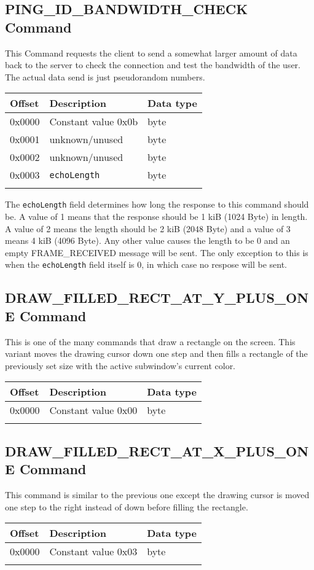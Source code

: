 \documentclass{article}
\newcommand{\field}[1]{\textcolor{fieldColor}{\texttt{#1}}}
\newenvironment{bytelisting}
{\ttfamily \begin{center} \begin{tabular}{l l l} Offset & Description & Data type \\ \hline}
{\normalfont \end{tabular} \end{center}}
\begin{document}
\subsection{PING\_ID\_BANDWIDTH\_CHECK Command}
This Command requests the client to send a somewhat larger amount of data back to the server to check the connection and test the bandwidth of the user. The actual data send is just 
pseudorandom numbers.

\begin{bytelisting}
0x0000 & Constant value 0x0b & byte \\
0x0001 & unknown/unused & byte \\
0x0002 & unknown/unused & byte \\
0x0003 & \field{echoLength} & byte \\
\end{bytelisting}

The \field{echoLength} field determines how long the response to this command should be. A value of 1 means that the response should be 1 kiB (1024 Byte) in length. A
value of 2 means the length should be 2 kiB (2048 Byte) and a value of 3 means 4 kiB (4096 Byte). Any other value causes the length to be 0 and an empty FRAME\_RECEIVED message will be sent.
The only exception to this is when the \field{echoLength} field itself is 0, in which case no respose will be sent.

\subsection{DRAW\_FILLED\_RECT\_AT\_Y\_PLUS\_ONE Command}
This is one of the many commands that draw a rectangle on the screen. This variant moves the drawing cursor down one step and then fills a rectangle of the previously set size with the active subwindow's 
current color.

\begin{bytelisting}
0x0000 & Constant value 0x00 & byte \\
\end{bytelisting}

\subsection{DRAW\_FILLED\_RECT\_AT\_X\_PLUS\_ONE Command}
This command is similar to the previous one except the drawing cursor is moved one step to the right instead of down before filling the rectangle.

\begin{bytelisting}
0x0000 & Constant value 0x03 & byte \\
\end{bytelisting}
\end{document}
